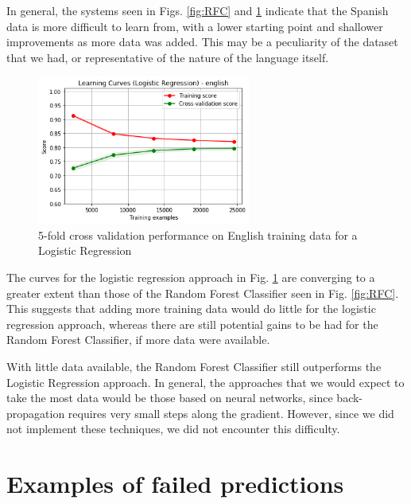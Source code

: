 \documentclass[11pt,a4paper]{article}
\begin{document}
In general, the systems seen in Figs. \ref{fig:RFC} and \ref{fig:Log} indicate that the Spanish data is more difficult to learn from, with a lower starting point and shallower improvements as more data was added. This may be a peculiarity of the dataset that we had, or representative of the nature of the language itself.

\begin{figure}[h]
\begin{minipage}[b]{1.0\linewidth}
  \centering
  \centerline{\includegraphics[width=7cm]{images/LogEng}}
\end{minipage}
\caption{5-fold cross validation performance on English training data for a Logistic Regression}
\label{fig:Log}
\end{figure}

The curves for the logistic regression approach in Fig. \ref{fig:Log} are converging to a greater extent than those of the Random Forest Classifier seen in Fig. \ref{fig:RFC}. This suggests that adding more training data would do little for the logistic regression approach, whereas there are still potential gains to be had for the Random Forest Classifier, if more data were available.

With little data available, the Random Forest Classifier still outperforms the Logistic Regression approach. In general, the approaches that we would expect to take the most data would be those based on neural networks, since back-propagation requires very small steps along the gradient. However, since we did not implement these techniques, we did not encounter this difficulty.



\section{Examples of failed predictions}
\end{document}
